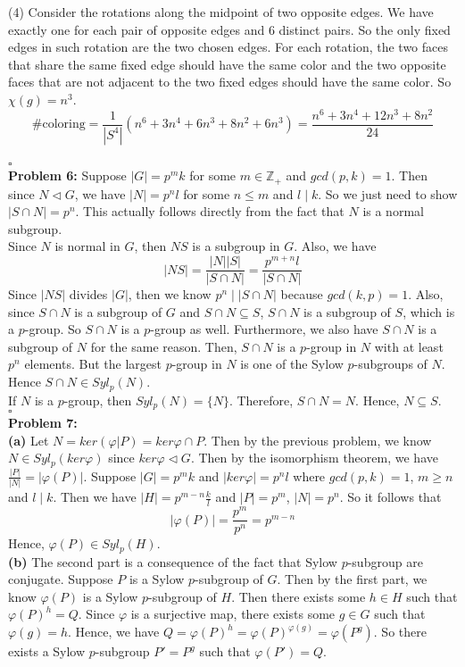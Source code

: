 \documentclass[12pt]{amsart}
\newcommand{\Z}{\mathbb{Z}}
\begin{document}
(4) Consider the rotations along the midpoint of two opposite edges. We have exactly one for each pair of opposite edges and 6 distinct pairs. So the only fixed edges in such rotation are the two chosen edges. For each rotation, the two faces that share the same fixed edge should have the same color and the two opposite faces that are not adjacent to the two fixed edges should have the same color. So $\chi(g)=n^3$.\\
\[\text{\# coloring}=\frac{1}{|S^4|}(n^6+3n^4+6n^3+8n^2+6n^3)=\frac{n^6+3n^4+12n^3+8n^2}{24}\]
\\\phantom{qed}\hfill$\square$\\
\textbf{Problem 6:} Suppose $|G|=p^mk$ for some $m\in \Z_+$ and $gcd(p,k)=1$. Then since $N\triangleleft G$, we have $|N|=p^nl$ for some $n\leq m$ and $l\mid k$. So we just need to show $|S\cap N|=p^n$. This actually follows directly from the fact that $N$ is a normal subgroup.\\
Since $N$ is normal in $G$, then $NS$ is a subgroup in $G$. Also, we have 
\[|NS|=\frac{|N||S|}{|S\cap N|}=\frac{p^{m+n}l}{|S\cap N|}\]
Since $|NS|$ divides $ |G|$, then we know $p^n\mid |S\cap N|$ because $gcd(k,p)=1$. Also, since $S\cap N$ is a subgroup of $G$ and $S\cap N\subseteq S$, $S\cap N$ is a subgroup of $S$, which is a $p$-group. So $S\cap N$ is a $p$-group as well. Furthermore, we also have $S\cap N$ is a subgroup of $N$ for the same reason. Then, $S\cap N$ is a $p$-group in $N$ with at least $p^n$ elements. But the largest $p$-group in $N$ is one of the Sylow $p$-subgroups of $N$. Hence $S\cap N\in Syl_p(N)$.\\
If $N$ is a $p$-group, then $Syl_p(N)=\{N\}$. Therefore, $S\cap N=N$. Hence, $N\subseteq S$.
\\\phantom{qed}\hfill$\square$\\
\textbf{Problem 7:}\\
\textbf{(a)} Let $N=ker(\varphi|P)=ker\varphi \cap P$. Then by the previous problem, we know $N\in Syl_p(ker\varphi)$ since $ker\varphi\triangleleft G$. Then by the isomorphism theorem, we have $\frac{|P|}{|N|}=|\varphi(P)|$. Suppose $|G|=p^mk$ and $|ker\varphi|=p^nl$ where $gcd(p,k)=1$, $m\geq n$ and $l\mid k$. Then we have $|H|=p^{m-n}\frac{k}{l}$ and $|P|=p^m$, $|N|=p^n$. So it follows that 
\[|\varphi(P)|=\frac{p^m}{p^n}=p^{m-n}\]
Hence, $\varphi(P)\in Syl_p(H)$.\\
\textbf{(b)} The second part is a consequence of the fact that Sylow $p$-subgroup are conjugate. Suppose $P$ is a Sylow $p$-subgroup of $G$. Then by the first part, we know $\varphi(P)$ is a Sylow $p$-subgroup of $H$. Then there exists some $h\in H$ such that $\varphi(P)^h=Q$. Since $\varphi$ is a surjective map, there exists some $g\in G$ such that $\varphi(g)=h$. Hence, we have $Q=\varphi(P)^h=\varphi(P)^{\varphi(g)}=\varphi(P^g)$. So there exists a Sylow $p$-subgroup $P'=P^g$ such that $\varphi(P')=Q$.
\end{document}
